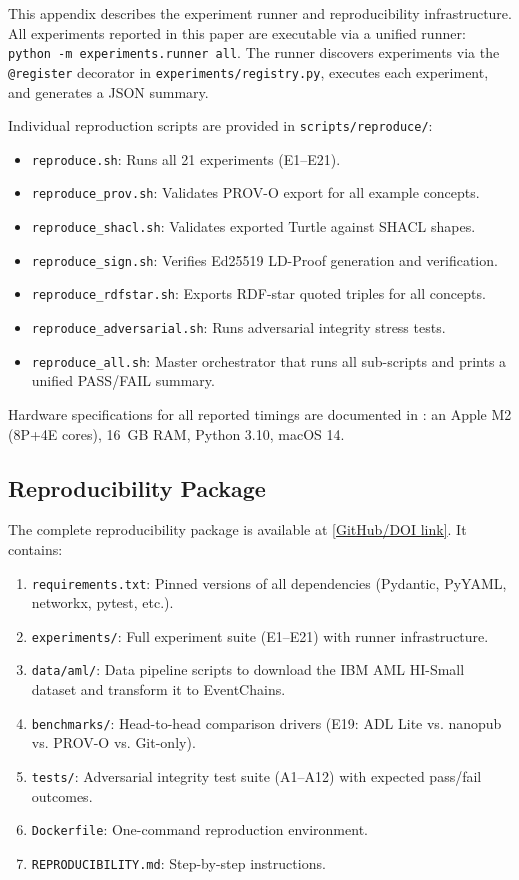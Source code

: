 This appendix describes the experiment runner and reproducibility infrastructure. All experiments reported in this paper are executable via a unified runner: \texttt{python -m experiments.runner all}. The runner discovers experiments via the \texttt{@register} decorator in \texttt{experiments/registry.py}, executes each experiment, and generates a JSON summary.

Individual reproduction scripts are provided in \texttt{scripts/reproduce/}:
\begin{itemize}[leftmargin=2em]
    \item \texttt{reproduce.sh}: Runs all 21 experiments (E1--E21).
    \item \texttt{reproduce\_prov.sh}: Validates PROV-O export for all example concepts.
    \item \texttt{reproduce\_shacl.sh}: Validates exported Turtle against SHACL shapes.
    \item \texttt{reproduce\_sign.sh}: Verifies Ed25519 LD-Proof generation and verification.
    \item \texttt{reproduce\_rdfstar.sh}: Exports RDF-star quoted triples for all concepts.
    \item \texttt{reproduce\_adversarial.sh}: Runs adversarial integrity stress tests.
    \item \texttt{reproduce\_all.sh}: Master orchestrator that runs all sub-scripts and prints a unified PASS/FAIL summary.
\end{itemize}

Hardware specifications for all reported timings are documented in : an Apple M2 (8P+4E cores), 16~GB RAM, Python 3.10, macOS 14.

\subsection{Reproducibility Package}

The complete reproducibility package is available at \url{[GitHub/DOI link]}. It contains:
\begin{enumerate}[leftmargin=2em]
    \item \texttt{requirements.txt}: Pinned versions of all dependencies (Pydantic, PyYAML, networkx, pytest, etc.).
    \item \texttt{experiments/}: Full experiment suite (E1--E21) with runner infrastructure.
    \item \texttt{data/aml/}: Data pipeline scripts to download the IBM AML HI-Small dataset and transform it to EventChains.
    \item \texttt{benchmarks/}: Head-to-head comparison drivers (E19: ADL Lite vs. nanopub vs. PROV-O vs. Git-only).
    \item \texttt{tests/}: Adversarial integrity test suite (A1--A12) with expected pass/fail outcomes.
    \item \texttt{Dockerfile}: One-command reproduction environment.
    \item \texttt{REPRODUCIBILITY.md}: Step-by-step instructions.
\end{enumerate}

